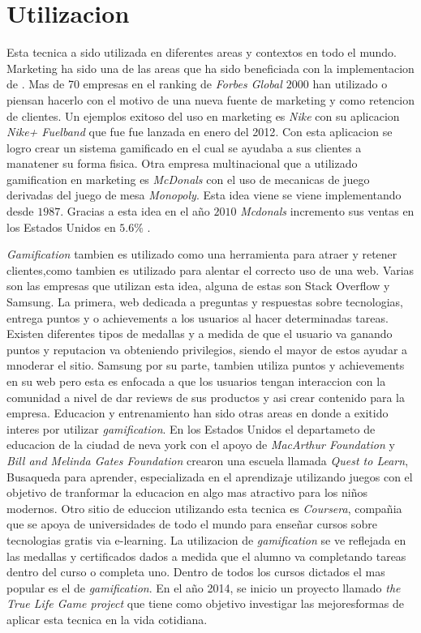 \section{Utilizacion}

Esta tecnica a sido utilizada en diferentes areas y contextos en todo el mundo. Marketing ha sido una 
de las areas que ha sido beneficiada con la implementacion de {\GAM}. Mas de 70 empresas en el ranking de 
\emph{Forbes Global $2000$} han utilizado o piensan hacerlo con el motivo de una nueva fuente de 
marketing y como retencion de clientes\cite{Gam:Util:1}. Un ejemplos exitoso del uso en marketing es \emph{Nike} 
con su aplicacion \emph{Nike+ Fuelband} que fue fue lanzada en enero del 2012\cite{Gam:Util:2}. 
Con esta aplicacion se logro crear un sistema gamificado en el cual se ayudaba a sus clientes a manatener 
su forma fisica. Otra empresa multinacional que a utilizado gamification en marketing es \emph{McDonals} 
con el uso de mecanicas de juego derivadas del juego de mesa \emph{Monopoly}. Esta idea viene se viene 
implementando desde $1987$. Gracias a esta idea en el año $2010$ \emph{Mcdonals} incremento sus ventas en los Estados
Unidos en $5.6\%$ \cite{Gam:Util:2}.

\emph{Gamification} tambien es utilizado como una herramienta para atraer y retener clientes,como tambien es
utilizado para alentar el correcto uso de una web. Varias son las empresas que utilizan esta idea, alguna de estas 
son Stack Overflow y Samsung. La primera, web dedicada a preguntas y respuestas sobre tecnologias, entrega puntos
 y o achievements a los usuarios al hacer determinadas tareas. Existen diferentes tipos de medallas y a medida
 de que el usuario va ganando puntos y reputacion va obteniendo privilegios, siendo el mayor de estos 
ayudar a mnoderar el sitio. Samsung por su parte, tambien utiliza puntos y achievements en su web pero
 esta es enfocada a que los usuarios tengan interaccion con la comunidad a nivel de dar reviews de sus 
productos y asi crear contenido para la empresa\cite{Gam:Util:3}. 
Educacion y entrenamiento han sido otras areas en donde a exitido interes por
utilizar \emph{gamification}. En los Estados Unidos el departameto de educacion de la ciudad de neva york
 con el apoyo de \emph{MacArthur Foundation} y \emph{Bill and Melinda Gates Foundation} crearon una escuela
 llamada \emph{Quest to Learn}, Busaqueda para aprender, especializada en el aprendizaje utilizando juegos 
con el objetivo de tranformar la educacion en algo mas atractivo para los niños modernos\cite{Gam:Util:4}. Otro sitio de educcion utilizando esta tecnica 
es \emph{Coursera}, compañia que se apoya de universidades de todo el mundo para enseñar
cursos sobre tecnologias gratis via e-learning. La utilizacion de \emph{gamification}
se ve reflejada en las medallas y certificados dados a medida que el alumno va completando
tareas dentro del curso o completa uno. Dentro de todos los cursos dictados el mas popular es
el de \emph{gamification}\cite{Gam:Util:5}. En el año 2014, se inicio un proyecto llamado
\emph{the True Life Game project} que tiene como objetivo investigar las mejoresformas de
aplicar esta tecnica en la vida cotidiana.

